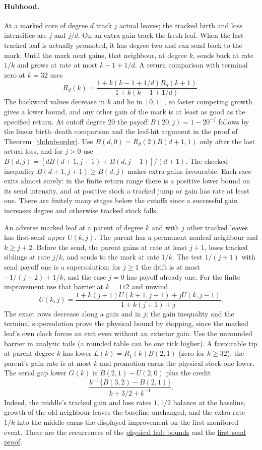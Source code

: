 \documentclass[11pt]{article}
\newcommand{\proofsrc}[2]{\href{https://github.com/uzay-eth/friend-tree-exponent/blob/a0972085ad72ad5685ae7b424988648d1965e73c/#1}{#2}}
\theoremstyle{remark}
\numberwithin{equation}{section}
\begin{document}
\paragraph{Hubhood.}
At a marked core of degree $d$ track $j$ actual leaves; the tracked birth and loss intensities are $j$ and $j/d$. On an extra gain track the fresh leaf. When the last tracked leaf is actually promoted, it has degree two and can send back to the mark. Until the mark next gains, that neighbour, at degree $k$, sends back at rate $1/k$ and grows at rate at most $k-1+1/d$. A return comparison with terminal zero at $k=32$ uses
\[
 R_d(k)=\frac{1+k(k-1+1/d)R_d(k+1)}{1+k(k-1+1/d)}.
\]
The backward values decrease in $k$ and lie in $[0,1]$, so faster competing growth gives a lower bound, and any other gain of the mark is at least as good as the specified return. At cutoff degree 20 the payoff $B(20,j)=1-20^{-j}$ follows by the linear birth--death comparison and the leaf-hit argument in the proof of Theorem~\ref{th:hub-order}. Use $B(d,0)=R_d(2)B(d+1,1)$ only after the last actual loss, and for $j>0$ use $B(d,j)=[d B(d+1,j+1)+B(d,j-1)]/(d+1)$. The checked inequality $B(d+1,j+1)\ge B(d,j)$ makes extra gains favourable. Each race exits almost surely: in the finite return range there is a positive lower bound on its send intensity, and at positive stock a tracked jump or gain has rate at least one. There are finitely many stages below the cutoffs since a successful gain increases degree and otherwise tracked stock falls.

An adverse marked leaf at a parent of degree $k$ and with $j$ other tracked leaves has first-send upper $U(k,j)$. The parent has a permanent nonleaf neighbour and $k\ge j+2$. Before the send, the parent gains at rate at least $j+1$, loses tracked siblings at rate $j/k$, and sends to the mark at rate $1/k$. The test $1/(j+1)$ with send payoff one is a supersolution: for $j\ge1$ the drift is at most $-1/(j+2)+1/k$, and the case $j=0$ has payoff already one. For the finite improvement use that barrier at $k=112$ and unwind
\[
 U(k,j)=\frac{1+k(j+1)U(k+1,j+1)+j U(k,j-1)}{1+k(j+1)+j}.
\]
The exact rows decrease along a gain and in $j$; the gain inequality and the terminal supersolution prove the physical bound by stopping, since the marked leaf's own clock forces an exit even without an exterior gain. Use the unrounded barrier in analytic tails (a rounded table can be one tick higher). A favourable tip at parent degree $k$ has lower $L(k)=R_1(k)B(2,1)$ (zero for $k\ge32$): the parent's gain rate is at most $k$ and promotion earns the physical stock-one lower. The serial gap lower $G(k)$ is $B(2,1)-U(2,0)$ plus the credit
\[
 \frac{k^{-1}\{B(3,2)-B(2,1)\}}{k+3/2+k^{-1}}.
\]
Indeed, the middle's tracked gain and loss rates $1,1/2$ balance at the baseline, growth of the old neighbour leaves the baseline unchanged, and the extra rate $1/k$ into the middle earns the displayed improvement on the first monitored event. These are the recurrences of the \proofsrc{round2/proofs/astra-late/source/round2/open/age-order/global-transport/hostile/README.md}{physical hub bounds} and the \proofsrc{round2/proofs/astra-late/source/round2/open/age-order/preplacement-transfer/README.md}{first-send proof}.
\end{document}
